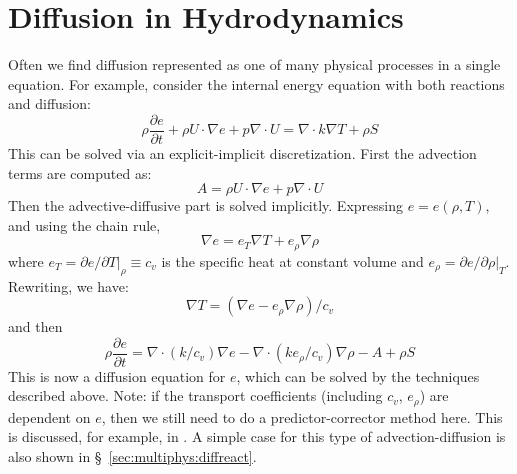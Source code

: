 \section{Diffusion in Hydrodynamics} 

Often we find diffusion represented as one of many physical processes
in a single equation.  For example, consider the internal energy
equation with both reactions and diffusion:
 \begin{equation}
 \rho\frac{\partial e}{\partial t} + \rho U \cdot \nabla e + p \nabla \cdot U = \nabla \cdot k \nabla T + \rho S
 \end{equation}
 This can be solved via an explicit-implicit discretization.  First
 the advection terms are computed as:
 \begin{equation}
 A = \rho U \cdot \nabla e + p \nabla \cdot U
 \end{equation}
 Then the advective-diffusive part is solved implicitly.  Expressing
 $e = e(\rho, T)$, and using the chain rule,
 \begin{equation}
   \nabla e = e_T \nabla T + e_\rho \nabla \rho
 \end{equation}
 where $e_T = \partial e / \partial T |_\rho \equiv c_v$ is the
 specific heat at constant volume and $e_\rho = \partial e / \partial
 \rho |_T$.  Rewriting, we have:
 \begin{equation}
 \nabla T = (\nabla e - e_\rho \nabla \rho)/c_v
 \end{equation}
  and then
 \begin{equation}
 \rho \frac{\partial e}{\partial t} = \nabla \cdot (k/c_v) \nabla e - \nabla \cdot (k e_\rho/c_v) \nabla \rho -A + \rho S
 \end{equation}
 This is now a diffusion equation for $e$, which can be solved by the
 techniques described above.  Note: if the transport coefficients
 (including $c_v$, $e_\rho$) are dependent on $e$, then we still need
 to do a predictor-corrector method here.  This is discussed, for
 example, in \cite{SNpaper,malone:2011}.  A simple case for this type of 
 advection-diffusion is also shown in \S~\ref{sec:multiphys:diffreact}.

